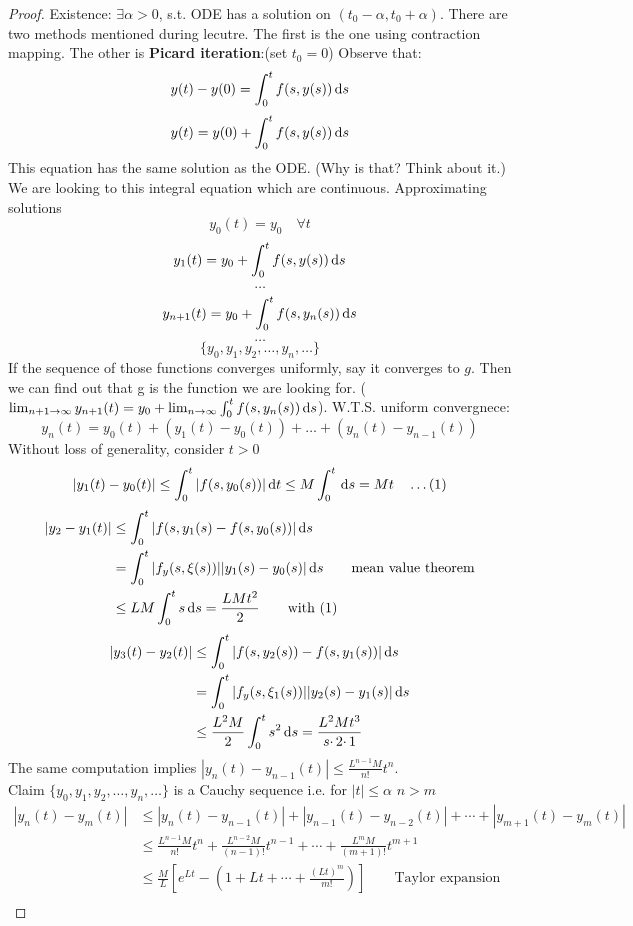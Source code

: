 \begin{proof}
Existence: $\exists \alpha>0$, s.t. ODE has a solution on $(t_0-\alpha,t_0+\alpha)$.
There are two methods mentioned during lecutre. The first is the one using contraction mapping. The other is \textbf{Picard iteration}:(set $t_0=0$)
Observe that:
\[y(t)-y(0)=\int_0^tf(s,y(s))\,\mathrm{d} s 
\]
\[y(t)=y(0)+\int_0^tf(s,y(s))\,\mathrm{d} s
\]
This equation has the same solution as the ODE. (Why is that? Think about it.) We are looking to this integral equation which are continuous.
Approximating solutions \[y_0(t)=y_0\quad\forall t\]
\[y_1(t)=y_0+\int_0^tf(s,y(s))\,\mathrm{d} s
\]
\[\dots
\]
\[y_{n+1}(t)=y_0+\int_0^tf(s,y_n(s))\,\mathrm{d} s
\]
\[\dots
\]
\[\{y_0,y_1,y_2,\dots,y_n,\dots\}
\]
If the sequence of those functions converges uniformly, say it converges to $g$. Then we can find out that g is the function we are looking for. ($\lim_{n+1\rightarrow\infty}y_{n+1}(t)=y_0+\lim_{n\rightarrow\infty}\int_0^tf(s,y_n(s))\,\mathrm{d} s$). W.T.S. uniform convergnece:\\
\[y_n(t)=y_0(t)+(y_1(t)-y_0(t))+\dots+(y_n(t)-y_{n-1}(t))
\]Without loss of generality, consider $t>0$
\[|y_1(t)-y_0(t)|\leq\int_0^t|f(s,y_0(s))|\,\mathrm{d} t\leq M\int_0^t\,\mathrm{d} s=Mt\quad\dots (1)
\]
\[\begin{aligned}|y_2-y_1(t)|&\leq\int_0^t|f(s,y_1(s)-f(s,y_0(s))|\,\mathrm{d} s\\
&=\int_0^t|f_y(s,\xi(s))||y_1(s)-y_0(s)|\,\mathrm{d} s \qquad\text{mean value theorem}\\
&\leq LM\int_0^ts\,\mathrm{d} s=\frac{LMt^2}{2}\qquad\text{with (1)}
\end{aligned}
\]
\[
\begin{aligned}|y_3(t)-y_2(t)|&\leq\int_0^t|f(s,y_2(s))-f(s,y_1(s))|\,\mathrm{d} s\\
&=\int_0^t|f_y(s,\xi_1(s))||y_2(s)-y_1(s)|\,\mathrm{d} s\\
&\leq\frac{L^2M}{2}\int_0^ts^2\,\mathrm{d} s=\frac{L^2Mt^3}{s\cdotp2\cdotp1}
\end{aligned}
\]
The same computation implies $|y_n(t)-y_{n-1}(t)|\leq\frac{L^{n-1}M}{n!}t^n$.\\
Claim $\{y_0, y_1, y_2, \dots, y_n, \dots\}$ is a Cauchy sequence i.e. for $|t|\leq\alpha$ $n>m$ 
\[\begin{aligned}
|y_n(t)-y_m(t)|
&\leq|y_n(t)-y_{n-1}(t)|+|y_{n-1}(t)-y_{n-2}(t)|+\cdots+|y_{m+1}(t)-y_{m}(t)|\\
&\leq\frac{L^{n-1}M}{n!}t^n+\frac{L^{n-2}M}{(n-1)!}t^{n-1}+\cdots+\frac{L^{m}M}{(m+1)!}t^{m+1}\\
&\leq\frac{M}{L}[e^{Lt}-(1+Lt+\cdots+\frac{(Lt)^m}{m!})]\qquad\text{Taylor expansion}\\

\end{aligned}\]
\end{proof}
